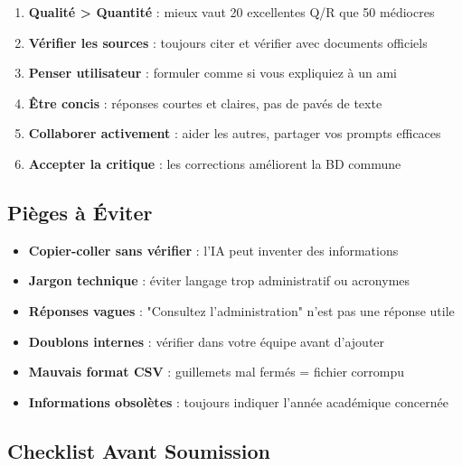 \documentclass[11pt,a4paper]{article}
\begin{document}
\begin{info}
\begin{enumerate}
    \item \textbf{Qualité > Quantité} : mieux vaut 20 excellentes Q/R que 50 médiocres
    \item \textbf{Vérifier les sources} : toujours citer et vérifier avec documents officiels
    \item \textbf{Penser utilisateur} : formuler comme si vous expliquiez à un ami
    \item \textbf{Être concis} : réponses courtes et claires, pas de pavés de texte
    \item \textbf{Collaborer activement} : aider les autres, partager vos prompts efficaces
    \item \textbf{Accepter la critique} : les corrections améliorent la BD commune
\end{enumerate}
\end{info}

\subsection{Pièges à Éviter}

\begin{important}
\begin{itemize}
    \item \textbf{Copier-coller sans vérifier} : l'IA peut inventer des informations
    \item \textbf{Jargon technique} : éviter langage trop administratif ou acronymes
    \item \textbf{Réponses vagues} : "Consultez l'administration" n'est pas une réponse utile
    \item \textbf{Doublons internes} : vérifier dans votre équipe avant d'ajouter
    \item \textbf{Mauvais format CSV} : guillemets mal fermés = fichier corrompu
    \item \textbf{Informations obsolètes} : toujours indiquer l'année académique concernée
\end{itemize}
\end{important}

\subsection{Checklist Avant Soumission}
\end{document}
